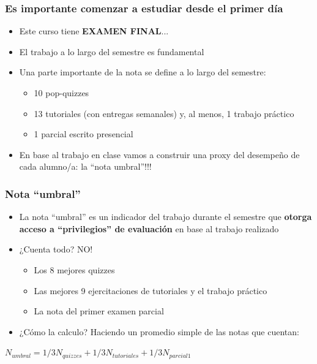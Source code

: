 \documentclass{beamer}
\begin{document}
\begin{frame}
\frametitle{Es importante comenzar a estudiar desde el primer día}
\begin{itemize}
    \item Este curso tiene \textbf{EXAMEN FINAL}...
    \item El trabajo a lo largo del semestre es fundamental
    \item Una parte importante de la nota se define a lo largo del semestre:
        \begin{itemize}
            \item 10 pop-quizzes
            \item 13 tutoriales (con entregas semanales) y, al menos, 1 trabajo práctico
            \item 1 parcial escrito presencial 
        \end{itemize}
    \item En base al trabajo en clase vamos a construir una proxy del desempeño de cada alumno/a: la ``nota umbral''!!!
\end{itemize}

\end{frame}

\begin{frame}
\frametitle{Nota ``umbral''}
\begin{itemize}
    \item La nota ``umbral'' es un indicador del trabajo durante el semestre que \textbf{otorga acceso a ``privilegios'' de evaluación} en base al trabajo realizado
    \item ¿Cuenta todo? NO!
        \begin{itemize}
            \item Los 8 mejores quizzes
            \item Las mejores 9 ejercitaciones de tutoriales y el trabajo práctico
            \item La nota del primer examen parcial
        \end{itemize}
    \item ¿Cómo la calculo? Haciendo un promedio simple de las notas que cuentan:
    \end{itemize}
    
\begin{center}
 $N_{umbral}=1/3N_{quizzes}+1/3N_{tutoriales}+1/3N_{parcial 1}$   
 
\end{center}    
\end{frame}
\end{document}
